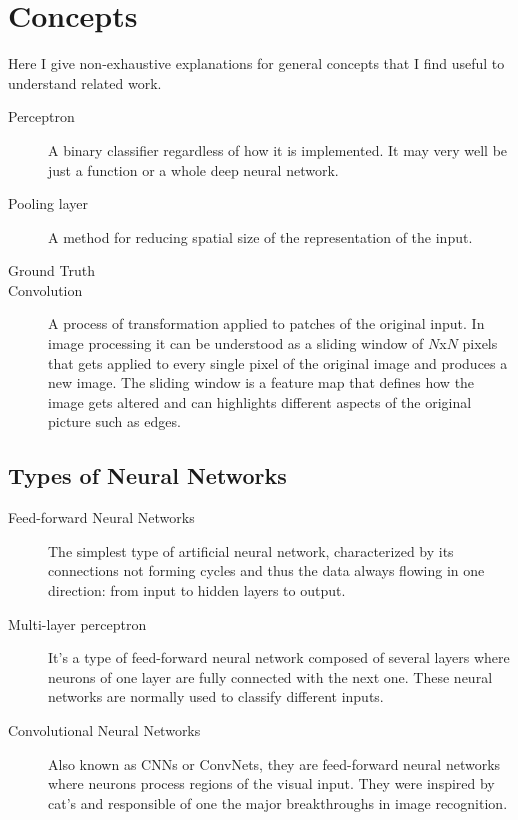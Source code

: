 
\chapter{Concepts}
\label{sec:concepts}


Here I give non-exhaustive explanations for general concepts that I find useful to understand related work.

\begin{description}


  \item[Perceptron]
  A binary classifier regardless of how it is implemented. It may very well be just a function or a whole deep neural network.

  \item[Pooling layer]
  A method for reducing spatial size of the representation of the input.

  \item[Ground Truth]

  \item[Convolution]
  A process of transformation applied to patches of the original input. In image processing it can be understood as a sliding window of $N$x$N$ pixels that gets applied to every single pixel of the original image and produces a new image. The sliding window is a feature map that defines how the image gets altered and can highlights different aspects of the original picture such as edges.
\end{description}



\section{Types of Neural Networks}
\label{sec:Types of Neural Networks}

\begin{description}
  \item[Feed-forward Neural Networks]
  The simplest type of artificial neural network, characterized by its connections not forming cycles and thus the data always flowing in one direction: from input to hidden layers to output.

  \item[Multi-layer perceptron]
  It's a type of feed-forward neural network composed of several layers where neurons of one layer are fully connected with the next one. These neural networks are normally used to classify different inputs.

  \item[Convolutional Neural Networks] Also known as CNNs or ConvNets, they are feed-forward neural networks where neurons process regions of the visual input. They were inspired by cat's and responsible of one the major breakthroughs in image recognition.
\end{description}


